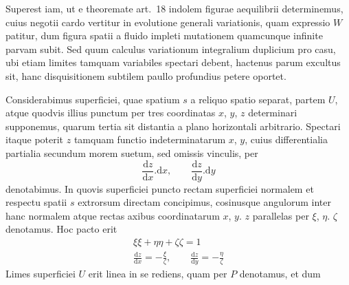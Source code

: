 Superest iam, ut e theoremate art.\ 18 indolem figurae aequilibrii determinemus, cuius negotii cardo vertitur in evolutione generali variationis, quam expressio $W$ patitur, dum figura spatii a fluido impleti mutationem quamcunque infinite parvam subit. Sed quum calculus variationum integralium duplicium pro casu, ubi etiam limites tamquam variabiles spectari debent, hactenus parum excultus sit, hanc disquisitionem subtilem paullo profundius petere oportet.

Considerabimus superficiei, quae spatium $s$ a reliquo spatio separat, partem $U$, atque quodvis illius punctum per tres coordinatas $x$, $y$, $z$ determinari supponemus, quarum tertia sit distantia a plano horizontali arbitrario. Spectari itaque poterit $z$ tamquam functio indeterminatarum $x$, $y$, cuius differentialia partialia secundum morem suetum, sed omissis vinculis, per
\[
\frac{\mathrm{d}z}{\mathrm{d}x}.\mathrm{d}x,\qquad\frac{\mathrm{d}z}{\mathrm{d}y}.\mathrm{d}y
\]
denotabimus. In quovis superficiei puncto rectam superficiei normalem et respectu spatii $s$ extrorsum directam concipimus, cosinusque angulorum inter hanc normalem atque rectas axibus coordinatarum $x$, $y$. $z$ parallelas per $\xi$, $\eta$. $\zeta$ denotamus. Hoc pacto erit
\[
\begin{gathered}
\xi\xi+\eta\eta+\zeta\zeta=1\\
\frac{\mathrm{d}z}{\mathrm{d}x}=-\frac{\xi}{\zeta},\qquad\frac{\mathrm{d}z}{\mathrm{d}y}=-\frac{\eta}{\zeta}
\end{gathered}
\]
Limes superficiei $U$ erit linea in se rediens, quam per $P$ denotamus, et dum
